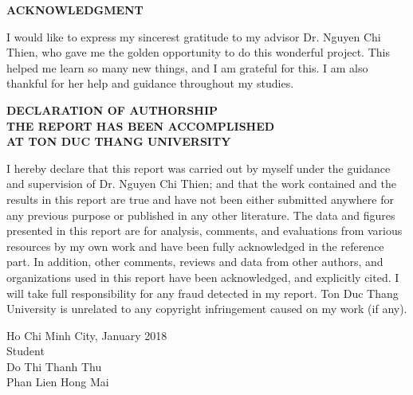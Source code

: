 	
	\newpage
	\thispagestyle{empty}
	\renewcommand{\baselinestretch}{1.2}
	\begin{center}
		\Large{\textbf{ACKNOWLEDGMENT}} \\
	\end{center}
	
I would like to express my sincerest gratitude to my advisor Dr. Nguyen Chi Thien, who gave me the golden opportunity to do this wonderful project. This helped me learn so many new things, and I am grateful for this. I am also thankful for her help and guidance throughout my studies.
	\newpage
	\thispagestyle{empty}
	\renewcommand{\baselinestretch}{1.2}
	
	\begin{center}
		\Large{\textbf{DECLARATION OF AUTHORSHIP}} \\
		\Large{\textbf{THE REPORT HAS BEEN ACCOMPLISHED}} \\
		\Large{\textbf{AT TON DUC THANG UNIVERSITY}} \\
	\end{center}
	
	I hereby declare that this report was carried out by myself under the guidance and supervision of Dr. Nguyen Chi Thien; and that the work contained and the results in this report are true and have not been either submitted anywhere for any previous purpose or published in any other literature. The data and figures presented in this report are for analysis, comments, and evaluations from various resources by my own work and have been fully acknowledged in the reference part.
	In addition, other comments, reviews and data from other authors, and organizations used in this report have been acknowledged, and explicitly cited.
	I will take full responsibility for any fraud detected in my report. Ton Duc Thang University is unrelated to any copyright infringement caused on my work (if any). \\
	
	\begin{flushright}
		Ho Chi Minh City, January 2018 \hspace*{1cm} \\
		Student  \hspace*{3cm} \\
		\vspace*{2cm}
		Do Thi Thanh Thu \hspace*{1.83cm} \\
		Phan Lien Hong Mai \hspace*{1.83cm} \\
	\end{flushright}
